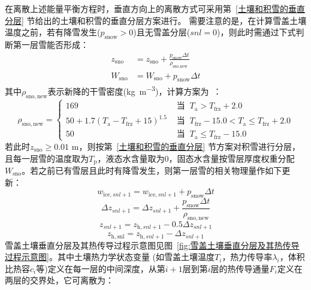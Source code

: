 在离散上述能量平衡方程时，垂直方向上的离散方式可采用第~\ref{土壤和积雪的垂直分层} 节给出的土壤和积雪的垂直分层方案进行。
需要注意的是，在计算雪盖土壤温度之前，若有降雪发生($p_{\mathrm {snow}} >0$)且无雪盖分层($snl=0$)，则此时需通过下式判断第一层雪能否形成：
\begin{equation}
  \begin{aligned}
    z_{\mathrm{sno}} &= z_{\mathrm{sno}}+\frac{p_{\mathrm{snow}} \Delta t}{\rho_{\text {sno,new }}} \\[1ex]
    W_{\mathrm{sno}} &= W_{\mathrm{sno}}+p_{\mathrm{snow}} \Delta t
  \end{aligned}
\end{equation}
其中$\rho_{\mathrm{sno,new}}$表示新降的干雪密度(\unit{kg.m^{-3}})，计算方案为~\citep{anderson1976point}：
\begin{equation}
  \rho_{\mathrm{sno, new}}=\begin{cases}
    169 & \text { 当 }\ T_{\mathrm{a}}>T_{\mathrm{frz}}+2.0 \\
    50+1.7\left(T_{\mathrm{a}}-T_{\mathrm{frz}}+15\right)^{1.5}  & \text { 当 }\ T_{\mathrm{frz}}-15.0<T_{\mathrm{a}} \leqslant T_{\mathrm{frz}}+2.0 \\
    50 & \text { 当 }\ T_{\mathrm{a}} \leqslant T_{\mathrm{frz}}-15.0
  \end{cases}
\end{equation}
若此时$z_{\mathrm{sno}} \geqslant 0.01$ \unit{m}，则按第~\ref{土壤和积雪的垂直分层} 节方案对积雪进行分层，且每一层雪的温度取为$T_{\mathrm {p}} $，液态水含量取为0，固态水含量按雪层厚度权重分配$W_{\mathrm{sno}}$。若之前已有雪层且此时有降雪发生，则第一层雪的相关物理量作如下更新：
\begin{equation}
  w_{\mathrm{ice},snl+1}=w_{\mathrm{ice},snl+1}+p_{\mathrm{snow}} \Delta t
\end{equation}
\begin{equation}
  \Delta z_{snl+1}=\Delta z_{snl+1}+\frac{p_{\mathrm{snow}} \Delta t}{\rho_{\mathrm{sno, new}}}
\end{equation}
\begin{equation}
  z_{snl+1}=z_{\mathrm{h},snl+1}-0.5 \Delta z_{snl+1}
\end{equation}
\begin{equation}
  z_{\mathrm{h, snl}}=z_{\mathrm{h},snl+1}-\Delta z_{snl+1}
\end{equation}
雪盖土壤垂直分层及其热传导过程示意图见图~\ref{fig:雪盖土壤垂直分层及其热传导过程示意图}。其中土壤热力学状态变量
(如雪盖土壤温度$T_{i} $，热力传导率$\lambda_i$，体积比热容$c_i$等)定义在每一层的中间深度，从第$i+1$层到第$i$层的热传导通量$F_i$定义在两层的交界处，它可离散为：
